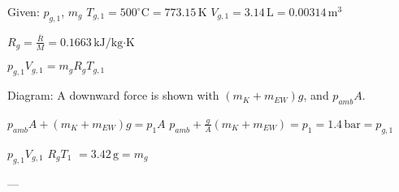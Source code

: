 Given: \( p_{g,1} \), \( m_g \)  
\( T_{g,1} = 500^\circ \text{C} = 773.15 \, \text{K} \)  
\( V_{g,1} = 3.14 \, \text{L} = 0.00314 \, \text{m}^3 \)  

\( R_g = \frac{\bar{R}}{M} = 0.1663 \, \text{kJ/kg·K} \)  

\( p_{g,1} V_{g,1} = m_g R_g T_{g,1} \)  

Diagram:  
A downward force is shown with \( (m_K + m_{EW}) g \), and \( p_{amb} A \).  

\( p_{amb} A + (m_K + m_{EW}) g = p_{1} A \)  
\( p_{amb} + \frac{g}{A} (m_K + m_{EW}) = p_{1} = 1.4 \, \text{bar} = p_{g,1} \)  

\( p_{g,1} V_{g,1} \)  
\( R_g T_{1} \)  
\( = 3.42 \, \text{g} = m_g \)  

---